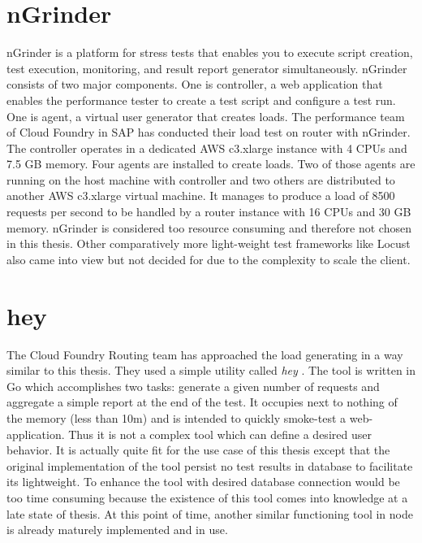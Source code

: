 \section{nGrinder}
nGrinder \citep{NGrinder} is a platform for stress tests that enables you to execute script creation, test execution, monitoring, and result report generator simultaneously. nGrinder consists of two major components. One is  controller, a web application that enables the performance tester to create a test script and configure a test run. One is agent, a virtual user generator that creates loads. 
The performance team of Cloud Foundry in SAP has conducted their load test on router with nGrinder. The controller operates in a dedicated AWS c3.xlarge instance with 4 CPUs and 7.5 GB memory. Four agents are installed to create loads. Two of those agents are running on the host machine with controller and two others are distributed to another AWS c3.xlarge virtual machine. It manages to produce a load of 8500 requests per second to be handled by a router instance with 16 CPUs and 30 GB memory. nGrinder is considered too resource consuming and therefore not chosen in this thesis. Other comparatively more light-weight test frameworks like Locust also came into view but not decided for due to the complexity to scale the client.\\

\section{hey}
The Cloud Foundry Routing team has approached the load generating in a way similar to this thesis. They used a simple utility called \textit{hey} \citep{Hey}. The tool is written in Go which accomplishes two tasks: generate a given number of requests and aggregate a simple report at the end of the test. It occupies next to nothing of the memory (less than 10m) and is intended to quickly smoke-test a web-application. Thus it is not a complex tool which can define a desired user behavior. It is actually quite fit for the use case of this thesis except that the original implementation of the tool persist no test results in database to facilitate its lightweight. To enhance the tool with desired database connection would be too time consuming because the existence of this tool comes into knowledge at a late state of thesis. At this point of time, another similar functioning tool in node is already maturely implemented and in use.\\    

